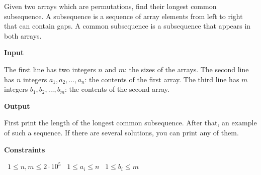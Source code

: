 Given two arrays which are permutations, find their longest common subsequence.
A subsequence is a sequence of array elements from left to right that can contain gaps. A common subsequence is a subsequence that appears in both arrays.

\vspace{0.3cm}\noindent\textbf{Input}

The first line has two integers $n$ and $m$: the sizes of the arrays.
The second line has $n$ integers $a_1,a_2,\dots,a_n$: the contents of the first array.
The third line has $m$ integers $b_1,b_2,\dots,b_m$: the contents of the second array.

\vspace{0.3cm}\noindent\textbf{Output}

First print the length of the longest common subsequence.
After that, an example of such a sequence. If there are several solutions, you can print any of them.

\vspace{0.3cm}\noindent\textbf{Constraints}

\textbullet\ $1 \le n,m \le 2 \cdot 10^5$
\textbullet\ $1 \le a_i \le n$
\textbullet\ $1 \le b_i \le m$